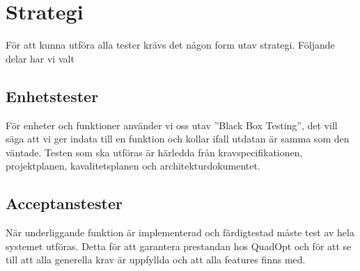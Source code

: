 \section{Strategi}
För att kunna utföra alla tester krävs det någon form utav strategi. Följande delar har vi valt

\subsection{Enhetstester}
För enheter och funktioner använder vi oss utav ''Black Box Testing'', det vill säga att vi ger indata till en funktion och kollar ifall utdatan är samma som den väntade. Testen som ska utföras är härledda från kravspecifikationen, projektplanen, kavalitetsplanen och architekturdokumentet.

\subsection{Acceptanstester}
När underliggande funktion är implementerad och färdigtestad måste test av hela systemet utföras. Detta för att garantera prestandan hos QuadOpt och för att se till att alla generella krav är uppfyllda och att alla features finns med. 
